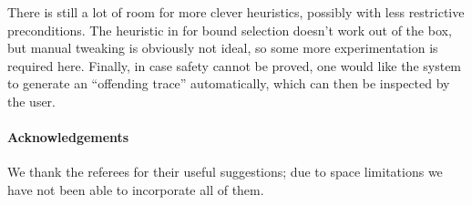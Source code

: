 \documentclass[runningheads]{llncs}
\begin{document}
There is still a lot of room for more clever
heuristics, possibly with less restrictive preconditions. The heuristic in
\cite{alur} for bound selection doesn't work out of the box, but
manual tweaking is obviously not ideal, so some more experimentation
is required here. Finally, in case safety cannot be proved, one would
like the system to generate an ``offending trace'' automatically,
which can then be inspected by the user.

\paragraph{Acknowledgements} 
We thank the referees for their useful suggestions; due
to space limitations we have not been able to incorporate all of them.

%


\end{document}
